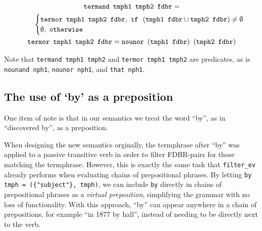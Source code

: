 \documentclass[../main.tex]{subfiles}
\begin{document}
\begin{gather*}
  \mathtt{termand}\enspace \mathtt{tmph1}\enspace \mathtt{tmph2}\enspace \mathtt{fdbr} = \\ \indent\indent
  \begin{cases}
    \mathtt{termor}\enspace \mathtt{tmph1}\enspace \mathtt{tmph2}\enspace \mathtt{fdbr},\ \mathtt{if} \enspace \left(\mathtt{tmph1}\enspace \mathtt{fdbr} \cup
    \mathtt{tmph2}\enspace \mathtt{fdbr}\right) \neq \mathtt{\emptyset} \\
    \emptyset,\ \mathtt{otherwise}
  \end{cases} \\
  \mathtt{termor}\enspace \mathtt{tmph1} \enspace \mathtt{tmph2} \enspace \mathtt{fdbr} = \mathtt{nounor}\enspace (\mathtt{tmph1}\enspace \mathtt{fdbr}) \enspace (\mathtt{tmph2} \enspace \mathtt{fdbr})
\end{gather*}

Note that \texttt{termand tmph1 tmph2} and \texttt{termor tmph1 tmph2} are predicates, as is \texttt{nounand nph1}, \texttt{nounor nph1}, and \texttt{that nph1}.

\subsection{The use of `by' as a preposition}

One item of note is that in our semantics we treat the word ``by'', as in ``discovered by'', as a preposition.

When designing the new semantics orginally, the termphrase after ``by'' was
applied to a passive transitive verb in order to filter FDBR-pairs for those matching
the termphrase.  However, this is exactly the same task that \texttt{filter\_ev} already performs when evaluating chains of prepositional phrases.
By letting \texttt{by tmph = (\{"subject"\}, tmph)}, we can include \texttt{by}
directly in chains of prepositional phrases as a {\em virtual preposition}, simplifying the grammar
with no loss of functionality.  With this approach, ``by'' can appear anywhere in a chain of prepositions, for example ``in 1877 by hall'', instead
of needing to be directly next to the verb.
\end{document}
